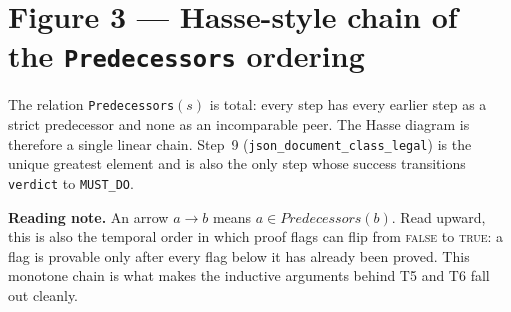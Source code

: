 \documentclass[10pt,a4paper]{article}
\begin{document}
\clearpage


\section*{Figure 3 — Hasse-style chain of the \texttt{Predecessors} ordering}

The relation \texttt{Predecessors}$(s)$ is total: every step has every
earlier step as a strict predecessor and none as an incomparable peer.
The Hasse diagram is therefore a single linear chain. Step~9
(\texttt{json\_document\_class\_legal}) is the unique greatest element
and is also the only step whose success transitions \texttt{verdict} to
\texttt{MUST\_DO}.

\vspace{6pt}

\begin{center}
\end{center}

\vspace{2pt}

\noindent\textbf{Reading note.} An arrow $a \to b$ means $a \in
\textit{Predecessors}(b)$. Read upward, this is also the temporal order
in which proof flags can flip from \textsc{false} to \textsc{true}: a
flag is provable only after every flag below it has already been proved.
This monotone chain is what makes the inductive arguments behind T5 and
T6 fall out cleanly.
\end{document}
